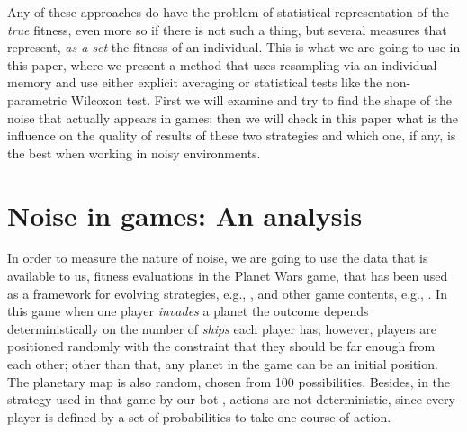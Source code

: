 \documentclass{svmult}
\begin{document}
Any of these approaches do have the problem of statistical
representation of the {\em true} fitness, even more so if there is not
such a thing, but several measures that represent, {\em as a set}
the fitness of an individual. This is what we are going to use in this
paper, where we present a method that uses resampling via an
individual memory and use either explicit averaging or statistical
tests like the non-parametric Wilcoxon test. 
First we will examine and try to find the shape of the noise that
actually appears in games; then we will check in this paper what is the influence on the quality of
results of these two strategies and which one, if any, is the best
when working in noisy environments.  


\section{Noise in games: An analysis}
\label{sec:noise}

In order to measure the nature of noise, we are going to use the data
that is available to us, fitness evaluations in the
Planet Wars game, that has been used as a framework for evolving strategies, e.g., \cite{DBLP:journals/jcst/MoraFGGF12}, and other game contents, e.g., \cite{lara2014balance}. %
In this game when one player {\em invades} a planet the outcome depends
deterministically on the number of {\em ships} each player has; however, players are positioned randomly with the
constraint that they should be far enough from each other; other than
that, any planet in the game can be an initial position. The planetary
map is also random, chosen from 100 possibilities. Besides, in
the strategy used in that game by our bot \cite{DBLP:conf/iwann/Fernandez-AresMMGF11}, actions are not deterministic, since
every player is defined by a set of probabilities to take one course
of action. 
\end{document}
